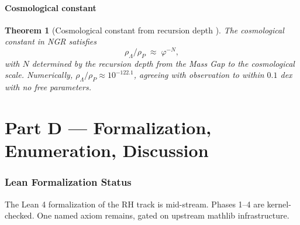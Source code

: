 \documentclass[11pt,a4paper]{article}
\theoremstyle{plain}
\newtheorem{theorem}{Theorem}[section]
\theoremstyle{definition}
\theoremstyle{remark}
\numberwithin{equation}{section}
\providecommand{\vp}{\varphi}
\begin{document}
\subsection{Cosmological constant}

\begin{theorem}[Cosmological constant from recursion depth
{\cite[Thm.~13.4]{synthesis-paper}}]
\label{thm:cosmological-constant}
The cosmological constant in NGR satisfies
\begin{equation}
  \rho_\Lambda / \rho_P \;\approx\; \vp^{-N},
\end{equation}
with $N$ determined by the recursion depth from the Mass Gap to
the cosmological scale.  Numerically,
$\rho_\Lambda / \rho_P \approx 10^{-122.1}$, agreeing with
observation to within $0.1$ dex with no free parameters.
\end{theorem}



\part*{Part D --- Formalization, Enumeration, Discussion}

\section{Lean Formalization Status}
\label{sec:lean}

The Lean 4 formalization \cite{echo-rh-lean} of the RH track is
mid-stream.  Phases 1--4 are kernel-checked.  One named axiom
remains, gated on upstream mathlib infrastructure.
\end{document}
